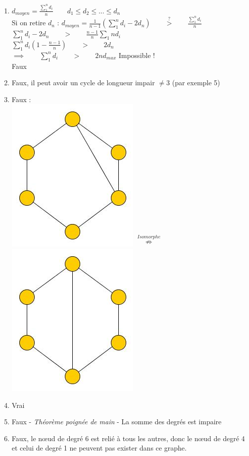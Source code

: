 \begin{solution}
  \begin{enumerate}
    \item{
        $d_{moyen} = \frac{\sum_{1}^{n} d_{i}}{n} \qquad d_{1} \leq d_{2} \leq ... \leq d_{n}$\\
        Si on retire $d_{n}$ :
        $d_{moyen} = \frac{1}{n-1}  (\sum_{1}^{n} d_{i} -2d_{n}) \qquad \stackrel{?}{>} \qquad \frac{\sum_{1}^{n}  d_{i}}{n}$\\
        $\sum_{1}^{n} d_{i} - 2d_{n} \qquad > \qquad \frac{n-1}{n} \sum_{1}{n} d_{i}$\\
        $\sum_{1}^{n} d_{i}(1- \frac{n-1}{n}) \qquad > \qquad 2d_{n}$\\
        $\implies \qquad \sum_{1}^{n} d_{i} \qquad > \qquad 2n d_{max}$ Impossible !\\
        Faux
      }
    \item{Faux, il peut avoir un cycle de longueur impair $\neq3$ (par exemple 5)}
    \item{Faux :\\
        \includegraphics[scale=0.3]{graph_ape1_ex1_3_1}
        $ \stackrel{Isomorphe}{\nRightarrow}$
        \includegraphics[scale=0.3]{graph_ape1_ex1_3_2}
      }
    \item{Vrai}
    \item{Faux - \textit{Théorème poignée de main} - La somme des degrés est impaire}
    \item{Faux, le nœud de degré 6 est relié à tous les autres, donc le nœud de degré 4 et celui de degré 1 ne peuvent pas exister dans ce graphe.}
  \end{enumerate}
\end{solution}

